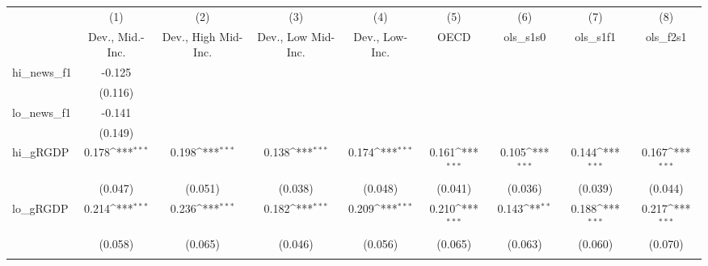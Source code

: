 {
\def\sym#1{\ifmmode^{#1}\else\(^{#1}\)\fi}
\begin{tabular}{l*{8}{c}}
\toprule
            &\multicolumn{1}{c}{(1)}&\multicolumn{1}{c}{(2)}&\multicolumn{1}{c}{(3)}&\multicolumn{1}{c}{(4)}&\multicolumn{1}{c}{(5)}&\multicolumn{1}{c}{(6)}&\multicolumn{1}{c}{(7)}&\multicolumn{1}{c}{(8)}\\
            &\multicolumn{1}{c}{Dev., Mid.-Inc.}&\multicolumn{1}{c}{Dev., High Mid-Inc.}&\multicolumn{1}{c}{Dev., Low Mid-Inc.}&\multicolumn{1}{c}{Dev., Low-Inc.}&\multicolumn{1}{c}{OECD}&\multicolumn{1}{c}{ols\_s1s0}&\multicolumn{1}{c}{ols\_s1f1}&\multicolumn{1}{c}{ols\_f2s1}\\
\midrule
hi\_news\_f1  &      -0.125         &                     &                     &                     &                     &                     &                     &                     \\
            &     (0.116)         &                     &                     &                     &                     &                     &                     &                     \\
\addlinespace
lo\_news\_f1  &      -0.141         &                     &                     &                     &                     &                     &                     &                     \\
            &     (0.149)         &                     &                     &                     &                     &                     &                     &                     \\
\addlinespace
hi\_gRGDP    &       0.178\sym{***}&       0.198\sym{***}&       0.138\sym{***}&       0.174\sym{***}&       0.161\sym{***}&       0.105\sym{***}&       0.144\sym{***}&       0.167\sym{***}\\
            &     (0.047)         &     (0.051)         &     (0.038)         &     (0.048)         &     (0.041)         &     (0.036)         &     (0.039)         &     (0.044)         \\
\addlinespace
lo\_gRGDP    &       0.214\sym{***}&       0.236\sym{***}&       0.182\sym{***}&       0.209\sym{***}&       0.210\sym{***}&       0.143\sym{**} &       0.188\sym{***}&       0.217\sym{***}\\
            &     (0.058)         &     (0.065)         &     (0.046)         &     (0.056)         &     (0.065)         &     (0.063)         &     (0.060)         &     (0.070)         \\
\addlinespace

\end{tabular}}
